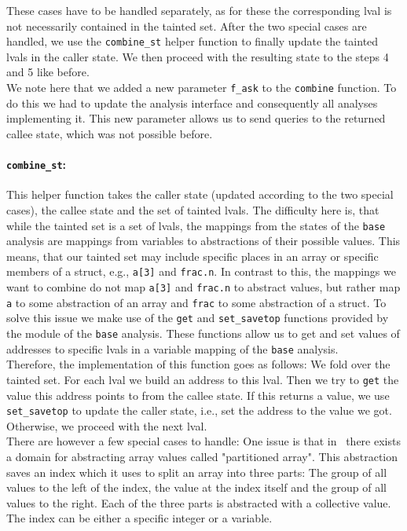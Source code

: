       These cases have to be handled separately, as for these the corresponding \ac{lval} is not necessarily contained in the tainted set. After the two special cases are handled, we use the \texttt{combine\_st} helper function to finally update the tainted \ac{lval}s in the caller state. We then proceed with the resulting state to the steps 4 and 5 like before.\\
      We note here that we added a new parameter \texttt{f\_ask} to the \texttt{combine} function. To do this we had to update the analysis interface and consequently all analyses implementing it. This new parameter allows us to send queries to the returned callee state, which was not possible before.
      \paragraph{\texttt{combine\_st}:} This helper function takes the caller state (updated according to the two special cases), the callee state and the set of tainted \ac{lval}s. The difficulty here is, that while the tainted set is a set of \ac{lval}s, the mappings from the states of the \texttt{base} analysis are mappings from variables to abstractions of their possible values. This means, that our tainted set may include specific places in an array or specific members of a struct, e.g., \texttt{a[3]} and \texttt{frac.n}. In contrast to this, the mappings we want to combine do not map \texttt{a[3]} and \texttt{frac.n} to abstract values, but rather map \texttt{a} to some abstraction of an array and \texttt{frac} to some abstraction of a struct. To solve this issue we make use of the \texttt{get} and \texttt{set\_savetop} functions provided by the module of the \texttt{base} analysis. These functions allow us to get and set values of addresses to specific \ac{lval}s in a variable mapping of the \texttt{base} analysis.\\
      Therefore, the implementation of this function goes as follows: We fold over the tainted set. For each \ac{lval} we build an address to this \ac{lval}. Then we try to \texttt{get} the value this address points to from the callee state. If this returns a value, we use \texttt{set\_savetop} to update the caller state, i.e., set the address to the value we got. Otherwise, we proceed with the next \ac{lval}.\\
      There are however a few special cases to handle: One issue is that in \gob\ there exists a domain for abstracting array values called "partitioned array". This abstraction saves an index which it uses to split an array into three parts: The group of all values to the left of the index, the value at the index itself and the group of all values to the right. Each of the three parts is abstracted with a collective value. The index can be either a specific integer or a variable.\\

